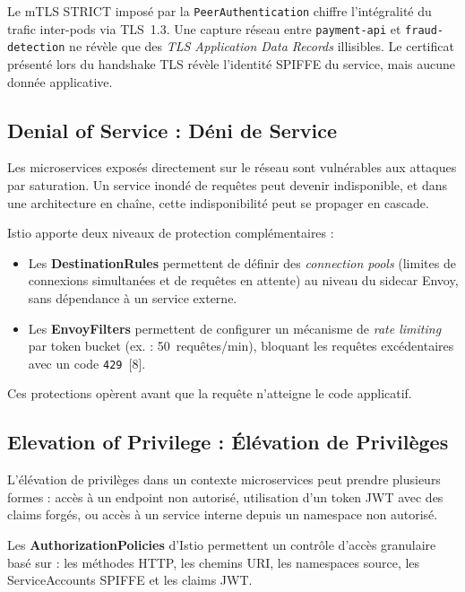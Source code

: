 Le mTLS STRICT imposé par la \texttt{PeerAuthentication} chiffre l'intégralité
du trafic inter-pods via TLS~1.3. Une capture réseau entre \texttt{payment-api}
et \texttt{fraud-detection} ne révèle que des \textit{TLS Application Data
Records} illisibles. Le certificat présenté lors du handshake TLS révèle
l'identité SPIFFE du service, mais aucune donnée applicative.

\subsection{Denial of Service : Déni de Service}

Les microservices exposés directement sur le réseau sont vulnérables aux attaques
par saturation. Un service inondé de requêtes peut devenir indisponible, et dans
une architecture en chaîne, cette indisponibilité peut se propager en cascade.

Istio apporte deux niveaux de protection complémentaires :

\begin{itemize}[topsep=4pt, itemsep=3pt]
  \item Les \textbf{DestinationRules} permettent de définir des
    \textit{connection pools} (limites de connexions simultanées et de requêtes
    en attente) au niveau du sidecar Envoy, sans dépendance à un service externe.

  \item Les \textbf{EnvoyFilters} permettent de configurer un mécanisme de
    \textit{rate limiting} par token bucket (ex. : 50~requêtes/min), bloquant
    les requêtes excédentaires avec un code \texttt{429}~[8].
\end{itemize}

Ces protections opèrent avant que la requête n'atteigne le code applicatif.

\subsection{Elevation of Privilege : Élévation de Privilèges}

L'élévation de privilèges dans un contexte microservices peut prendre plusieurs
formes : accès à un endpoint non autorisé, utilisation d'un token JWT avec des
claims forgés, ou accès à un service interne depuis un namespace non autorisé.

Les \textbf{AuthorizationPolicies} d'Istio permettent un contrôle d'accès
granulaire basé sur : les méthodes HTTP, les chemins URI, les namespaces source,
les ServiceAccounts SPIFFE et les claims JWT.

